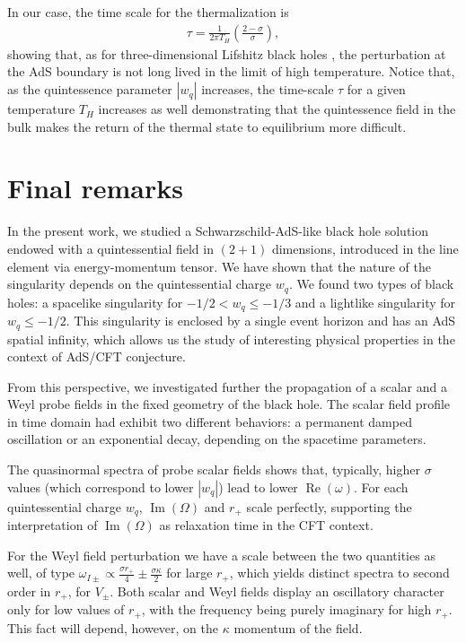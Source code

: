 \documentclass[preprint]{revtex4-1}
\renewcommand{\Re}{\operatorname{Re}}
\renewcommand{\Im}{\operatorname{Im}}
\def\be{\begin{eqnarray}}
\def\ee{\end{eqnarray}}
\begin{document}
In our case, the time scale for the thermalization is 
\be\label{timescale}
\tau=\frac{1}{2\pi T_{H}}\left(\frac{2-\sigma}{\sigma}\right),
\ee
showing that, as for three-dimensional Lifshitz black holes \cite{Abdalla:2011fd}, the perturbation at the AdS  boundary is not long lived in the limit of high temperature. Notice that, as the quintessence parameter  $|w_q|$  increases, the time-scale $\tau$ for a given temperature $T_{H}$ increases as well demonstrating that the quintessence field in the bulk makes the return of the thermal state to equilibrium more difficult.

\section{Final remarks}\label{conclusoes}

In the present work, we studied a Schwarzschild-AdS-like black hole solution endowed with a quintessential field in $(2+1)$ dimensions, introduced in the line element via energy-momentum tensor. We have shown that the nature of the singularity depends on the quintessential charge $w_q$. We found two types of black holes: a spacelike singularity for $-1/2 < w_q \leq -1/3$ and a lightlike singularity for $w_q \leq -1/2$. This singularity is enclosed by a single event horizon and has an AdS spatial infinity, which allows us the study of interesting physical properties in the context of AdS/CFT conjecture. 

From this perspective, we investigated further the propagation of a scalar and a Weyl probe fields in the fixed geometry of the black hole. The scalar field profile in time domain had exhibit two different behaviors: a permanent damped oscillation or an exponential decay, depending on the spacetime parameters. 

The quasinormal spectra of probe scalar fields shows that, typically, higher $\sigma$ values (which correspond to lower $|w_q|$) lead to lower $\Re(\omega)$. For each quintessential charge $w_q$, $\Im(\Omega)$ and $r_+$ scale perfectly, supporting the interpretation of $\Im(\Omega)$ as relaxation time in the CFT context.

For the Weyl field perturbation we have a scale between the two quantities as well, of type $\omega_{I \pm} \propto \frac{\sigma r_+}{4} \pm \frac{\sigma \kappa}{2}$ for large $r_+$, which yields distinct spectra to second order in $r_+$, for $V_\pm$. Both scalar and Weyl fields display an oscillatory character only for low values of $r_+$, with the frequency being purely imaginary for high $r_+$. This fact will depend, however, on the $\kappa$ momentum of the field.
\end{document}
